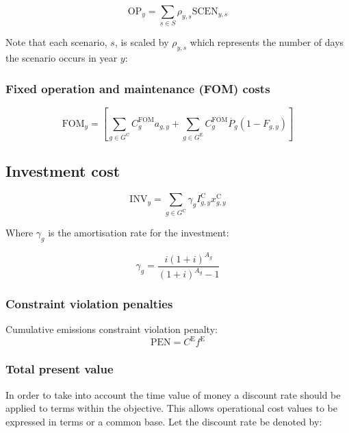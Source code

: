 \documentclass{article}
\newcommand{\sGeneratorsExisting}{G^{\mathrm{E}}}
\newcommand{\sGeneratorsCandidate}{G^{\mathrm{C}}}
\newcommand{\sScenarios}{S}
\newcommand{\iGenerator}{g}
\newcommand{\iYear}{y}
\newcommand{\iScenario}{s}
\newcommand{\cOperatingCost}[1][\iYear,\iScenario]{\mathrm{OP}_{#1}}
\newcommand{\cFixedOperationsMaintenanceCost}[1][\iYear]{\mathrm{FOM}_{#1}}
\newcommand{\cFixedOperationsMaintenanceCostGenerator}[1][\iGenerator]{C^{\mathrm{FOM}}_{#1}}
\newcommand{\cScenarioDuration}[1][\iYear,\iScenario]{\rho_{#1}}
\newcommand{\cPowerOutputMax}[1][\iGenerator,\iYear]{\overline{P}_{#1}}
\newcommand{\cAmortisationRate}[1][\iGenerator]{\gamma_{#1}}
\newcommand{\cCandidateInvestmentCost}[1][\iGenerator,\iYear]{I^{\mathrm{C}}_{#1}}
\newcommand{\cInvestmentCost}[1][\iYear]{\mathrm{INV}_{#1}}
\newcommand{\cInterestRate}{i}
\newcommand{\cAssetLifetime}[1][\iGenerator]{A_{#1}}
\newcommand{\cEmissionsTargetViolationPenalty}{C^{\mathrm{E}}}
\newcommand{\cEmissionsViolationTotalCost}{\mathrm{PEN}}
\newcommand{\cOperatingCostScenario}[1][\iYear,\iScenario]{\mathrm{SCEN}_{#1}}
\newcommand{\cRetirementIndicator}[1][\iGenerator,\iYear]{F_{#1}}
\newcommand{\vInstalledCapacity}[1][\iGenerator,\iYear]{x^{\mathrm{C}}_{#1}}
\newcommand{\vEmissionsTargetViolation}{f^{\mathrm{E}}}
\newcommand{\vInstalledCapacityTotal}[1][\iGenerator,\iYear]{a_{#1}}
\begin{document}
\begin{equation}
\cOperatingCost[\iYear] = \sum\limits_{\iScenario \in \sScenarios} \cScenarioDuration \cOperatingCostScenario
\end{equation}

Note that each scenario, $\iScenario$, is scaled by $\cScenarioDuration$ which represents the number of days the scenario occurs in year $\iYear$:

\subsubsection{Fixed operation and maintenance (FOM) costs}

\begin{equation}
\cFixedOperationsMaintenanceCost = \left[\sum\limits_{\iGenerator \in \sGeneratorsCandidate} \cFixedOperationsMaintenanceCostGenerator \vInstalledCapacityTotal + \sum\limits_{\iGenerator \in \sGeneratorsExisting} \cFixedOperationsMaintenanceCostGenerator \cPowerOutputMax[\iGenerator] \left(1 - \cRetirementIndicator\right) \right]
\end{equation}

\subsection{Investment cost}

\begin{equation}
\cInvestmentCost = \sum\limits_{g\in \sGeneratorsCandidate} \cAmortisationRate  \cCandidateInvestmentCost \vInstalledCapacity
\end{equation}

Where $\cAmortisationRate$ is the amortisation rate for the investment:

\begin{equation}
\cAmortisationRate = \frac{\cInterestRate(1+\cInterestRate)^{\cAssetLifetime}}{(1+\cInterestRate)^{\cAssetLifetime} - 1}
\end{equation}

\subsubsection{Constraint violation penalties}
Cumulative emissions constraint violation penalty:
\begin{equation}
\cEmissionsViolationTotalCost = \cEmissionsTargetViolationPenalty \vEmissionsTargetViolation
\end{equation}

\subsubsection{Total present value}
In order to take into account the time value of money a discount rate should be applied to terms within the objective. This allows operational cost values to be expressed in terms or a common base. Let the discount rate be denoted by:
\end{document}
